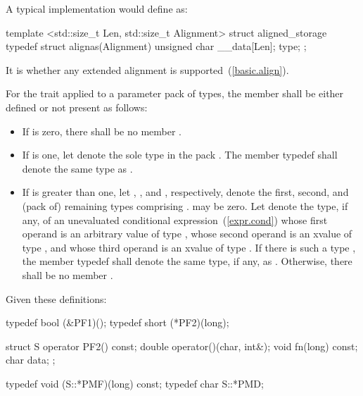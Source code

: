 \pnum
\enternote A typical implementation would define  as:

\begin{codeblock}
template <std::size_t Len, std::size_t Alignment>
struct aligned_storage {
  typedef struct {
    alignas(Alignment) unsigned char __data[Len];
  } type;
};
\end{codeblock}
\exitnote

\pnum
It is  whether any extended alignment is
supported~(\ref{basic.align}).

\pnum
For the  trait applied to a parameter pack  of types,
the member  shall be either defined or not present as follows:

\begin{itemize}
\item If  is zero, there shall be no member .

\item If  is one, let  denote the sole type
in the pack . The member typedef  shall denote the same
type as .

\item If  is greater than one,
let , , and , respectively,
denote the first, second, and (pack of) remaining types comprising .
\enternote {} may be zero. \exitnote
Let  denote the type, if any,
of an unevaluated conditional expression~(\ref{expr.cond})
whose first operand is an arbitrary value of type ,
whose second operand is an xvalue of type , and
whose third operand is an xvalue of type .
If there is such a type , the member typedef 
shall denote the same type, if any, as .
Otherwise, there shall be no member .
\end{itemize}

\pnum
\enterexample
Given these definitions:
\begin{codeblock}
typedef bool (&PF1)();
typedef short (*PF2)(long);

struct S {
  operator PF2() const;
  double operator()(char, int&);
  void fn(long) const;
  char data;
};

typedef void (S::*PMF)(long) const;
typedef char S::*PMD;
\end{codeblock}

